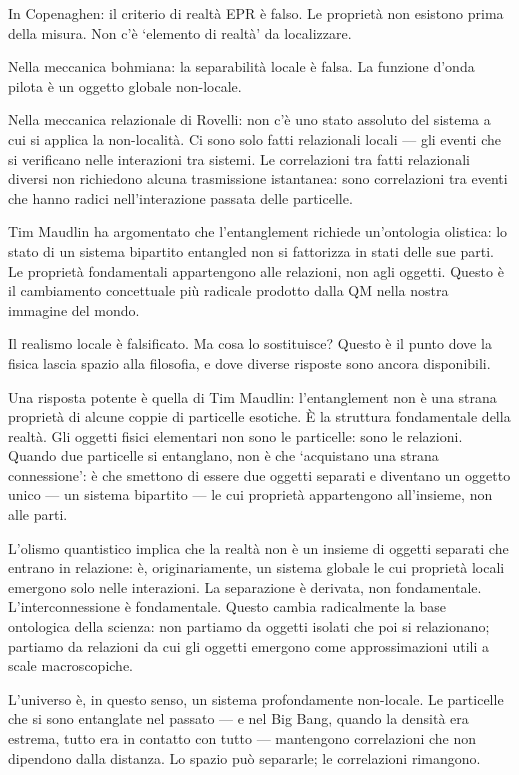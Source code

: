 \documentclass[12pt,a4paper,openany]{book}
\newcommand{\sezione}[1]{\vspace{1.2em}{\large\bfseries #1}\vspace{0.5em}\par}
\begin{document}
In Copenaghen: il criterio di realtà EPR è falso. Le proprietà non esistono prima della misura. Non c'è `elemento di realtà' da localizzare.

Nella meccanica bohmiana: la separabilità locale è falsa. La funzione d'onda pilota è un oggetto globale non-locale.

Nella meccanica relazionale di Rovelli: non c'è uno stato assoluto del sistema a cui si applica la non-località. Ci sono solo fatti relazionali locali — gli eventi che si verificano nelle interazioni tra sistemi. Le correlazioni tra fatti relazionali diversi non richiedono alcuna trasmissione istantanea: sono correlazioni tra eventi che hanno radici nell'interazione passata delle particelle.

Tim Maudlin ha argomentato che l'entanglement richiede un'ontologia olistica: lo stato di un sistema bipartito entangled non si fattorizza in stati delle sue parti. Le proprietà fondamentali appartengono alle relazioni, non agli oggetti. Questo è il cambiamento concettuale più radicale prodotto dalla QM nella nostra immagine del mondo.

\sezione{L'entanglement come struttura fondamentale della realtà}

Il realismo locale è falsificato. Ma cosa lo sostituisce? Questo è il punto dove la fisica lascia spazio alla filosofia, e dove diverse risposte sono ancora disponibili.

Una risposta potente è quella di Tim Maudlin: l'entanglement non è una strana proprietà di alcune coppie di particelle esotiche. È la struttura fondamentale della realtà. Gli oggetti fisici elementari non sono le particelle: sono le relazioni. Quando due particelle si entanglano, non è che `acquistano una strana connessione': è che smettono di essere due oggetti separati e diventano un oggetto unico --- un sistema bipartito --- le cui proprietà appartengono all'insieme, non alle parti.

L'olismo quantistico implica che la realtà non è un insieme di oggetti separati che entrano in relazione: è, originariamente, un sistema globale le cui proprietà locali emergono solo nelle interazioni. La separazione è derivata, non fondamentale. L'interconnessione è fondamentale. Questo cambia radicalmente la base ontologica della scienza: non partiamo da oggetti isolati che poi si relazionano; partiamo da relazioni da cui gli oggetti emergono come approssimazioni utili a scale macroscopiche.

L'universo è, in questo senso, un sistema profondamente non-locale. Le particelle che si sono entanglate nel passato --- e nel Big Bang, quando la densità era estrema, tutto era in contatto con tutto --- mantengono correlazioni che non dipendono dalla distanza. Lo spazio può separarle; le correlazioni rimangono.
\end{document}
